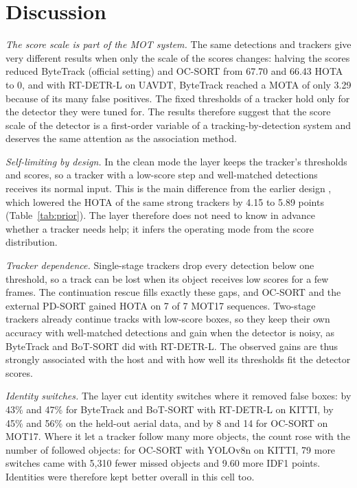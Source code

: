 \section{Discussion}\label{sec:discussion}

\emph{The score scale is part of the MOT system.} The same detections and trackers give very
different results when only the scale of the scores changes: halving the scores reduced ByteTrack
(official setting) and OC-SORT from 67.70 and 66.43 HOTA to 0, and with RT-DETR-L on UAVDT, ByteTrack
reached a MOTA of only 3.29 because of its many false positives. The fixed thresholds of a tracker
hold only for the detector they were tuned for. The results therefore suggest that the score scale
of the detector is a first-order variable of a tracking-by-detection system and deserves the same
attention as the association method.

\emph{Self-limiting by design.} In the clean mode the layer keeps the tracker's thresholds and
scores, so a tracker with a low-score step and well-matched detections receives its normal input.
This is the main difference from the earlier design \aob{}, which lowered the HOTA of the same
strong trackers by 4.15 to 5.89 points (Table~\ref{tab:prior}). The layer therefore does not need
to know in advance whether a tracker needs help; it infers the operating mode from the score
distribution.

\emph{Tracker dependence.} Single-stage trackers drop every detection below one threshold, so a
track can be lost when its object receives low scores for a few frames. The continuation rescue
fills exactly these gaps, and OC-SORT and the external PD-SORT gained HOTA on 7 of 7 MOT17 sequences.
Two-stage trackers already continue tracks with low-score boxes, so they keep their own accuracy
with well-matched detections and gain when the detector is noisy, as ByteTrack and BoT-SORT did with
RT-DETR-L. The observed gains are thus strongly associated with the host and with how well its
thresholds fit the detector scores.

\emph{Identity switches.} The layer cut identity switches where it removed false boxes: by 43\% and
47\% for ByteTrack and BoT-SORT with RT-DETR-L on KITTI, by 45\% and 56\% on the held-out aerial
data, and by 8 and 14 for OC-SORT on MOT17. Where it let a tracker follow many more objects, the
count rose with the number of followed objects: for OC-SORT with YOLOv8n on KITTI, 79 more switches
came with 5,310 fewer missed objects and 9.60 more IDF1 points. Identities were therefore kept
better overall in this cell too.

